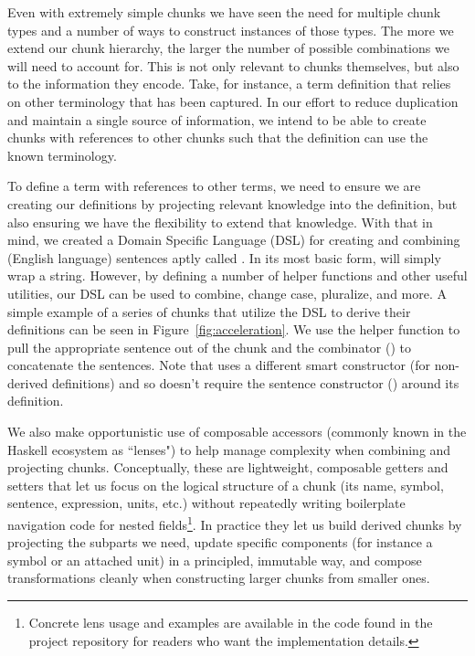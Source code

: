 Even with extremely simple chunks we have seen the need for multiple chunk 
types and a number of ways to construct instances of those types. The more we 
extend our chunk hierarchy, the larger the number of possible combinations we 
will need to account for. This is not only relevant to chunks themselves, but 
also to the information they encode. Take, for instance, a term definition that 
relies on other terminology that has been captured. In our effort to reduce 
duplication and maintain a single source of information, we intend to be able 
to create chunks with references to other chunks such that the definition can 
use the known terminology.

To define a term with references to other terms, we need to ensure we are 
creating our definitions by projecting relevant knowledge into the definition, 
but also ensuring we have the flexibility to extend that knowledge. With that 
in mind, we created a Domain Specific Language (DSL) for creating and combining 
(English language) sentences aptly called . In its most basic 
form,  will simply wrap a string. However, by defining a number 
of helper functions and other useful utilities, our  DSL can be 
used to combine, change case, pluralize, and more. A simple example of a series 
of chunks that utilize the  DSL to derive their definitions can 
be seen in Figure~\ref{fig:acceleration}. We use the  helper 
function to pull the appropriate sentence out of the  chunk and 
the combinator (\codeH{+:+}) to concatenate the sentences. Note that 
 uses a different smart constructor (for non-derived 
definitions) and so doesn't require the sentence constructor () around 
its definition.


We also make opportunistic use of composable accessors (commonly known in the 
Haskell ecosystem as ``lenses") to help manage complexity when combining and 
projecting chunks. Conceptually, these are lightweight, composable getters and 
setters that let us focus on the logical structure of a chunk (its name, 
symbol, sentence, expression, units, etc.) without repeatedly writing 
boilerplate navigation code for nested fields\footnote{Concrete lens usage and 
examples are available in the code found in the project repository for 
readers who want the implementation details.}. In practice they let us build 
derived chunks by projecting the subparts we need, update specific components 
(for instance a symbol or an attached unit) in a principled, immutable way, and 
compose transformations cleanly when constructing larger chunks from smaller 
ones. 

